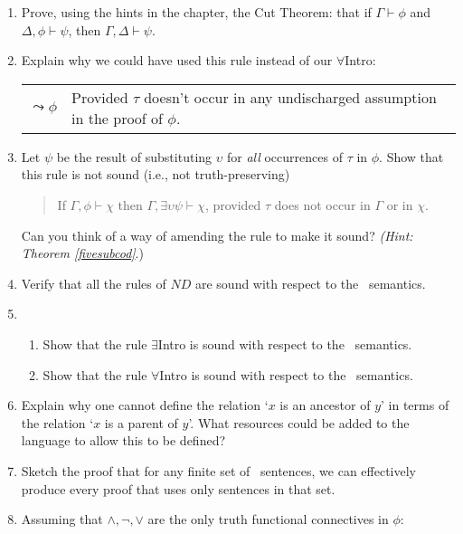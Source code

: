 {\begin{enumerate}
\item Prove, using the hints in the chapter, the Cut Theorem: that if $\Gamma\vdash\phi$ and $\Delta,\phi\vdash\psi$, then $\Gamma,\Delta\vdash\psi$.
\item Explain why we could have used this rule instead of our $\forall$Intro: \begin{center}
	\begin{tabular}{cp{5cm}}
		\begin{prooftree}
			\[\leadsto \phi\] \justifies \forall \upsilon \phi[\upsilon/\tau] \using{{\forall}\text{Intro}}
		\end{prooftree} &{\footnotesize Provided $\tau$ doesn't occur in any undischarged assumption in the proof of $\phi$.}
	\end{tabular}
\end{center}  
\item Let $\psi$ be the result of substituting $\upsilon$ for \emph{all} occurrences of $\tau$ in $\phi$. Show that this rule is not sound (i.e., not truth-preserving) \begin{quotation}
	If $\Gamma,\phi \vdash \chi$ then $\Gamma,\exists \upsilon \psi \vdash \chi$, provided $\tau$ does not occur in $\Gamma$ or in $\chi$.
\end{quotation} Can you think of a way of amending the rule to make it sound? \emph{(Hint: Theorem \ref{fivesubcod}}.)
\item Verify that all the rules of $ND$ are sound with respect to the \ltwo\ semantics.
\item \begin{enumerate}
	\item Show that the rule $\exists$Intro is sound with respect to the \ltwo\ semantics.
	\item Show that the rule $\forall$Intro is sound with respect to the \ltwo\ semantics.
\end{enumerate}
\item Explain why one cannot define the relation `$x$ is an ancestor of $y$' in terms of the relation `$x$ is a parent of $y$'. What resources could be added to the language to allow this to be defined?
\item Sketch the proof that for any finite set of \ltwo\ sentences, we can effectively produce every proof that uses only sentences in that set.
\item Assuming that $\wedge,\neg,\vee$ are the only truth functional connectives in $\phi$: \begin{enumerate}

\end{enumerate}
\end{enumerate}}

